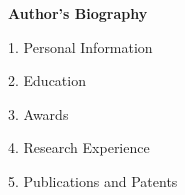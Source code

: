\centerline{\xiaoyi\bf Author's Biography}

\begin{spacing}{1.5}
1.	Personal Information


2. 	Education

3.	Awards



4.	Research Experience



5.	Publications and Patents


\end{spacing}